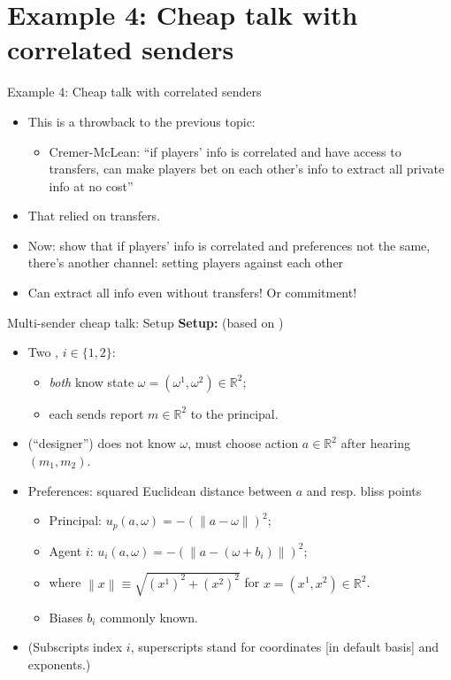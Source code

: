 \documentclass[english,10pt
,aspectratio=169
]{beamer}
\begin{document}
\section{Example 4: Cheap talk with correlated senders}

\begin{frame}{Example 4: Cheap talk with correlated senders}
	\begin{itemize}
		\item This is a throwback to the previous topic:
		\begin{itemize}
			\item Cremer-McLean: ``if players' info is correlated and have access to transfers, can make players bet on each other's info to extract all private info at no cost''
		\end{itemize}
		
		\item That relied on transfers. 
		\item Now: show that if players' info is correlated and preferences not the same, there's another channel: setting players against each other
		\item Can extract all info even without transfers! Or commitment!
	\end{itemize}
\end{frame}


\begin{frame}{Multi-sender cheap talk: Setup}
	\textbf{Setup:} (based on \cite{battaglini_multiple_2002})
	\begin{itemize}
		\item Two , $i \in \{1,2\}$:
		\begin{itemize}
			\item \emph{both} know \alert{state} $\omega = (\omega^1,\omega^2) \in \mathbb{R}^2$;
			\item each sends \alert{report} $m \in \mathbb{R}^2$ to the principal.
		\end{itemize}
		\item {} (``designer'') does not know $\omega$, must choose action $a \in \mathbb{R}^2$ \alert{after} hearing $(m_1,m_2)$.
		\item Preferences: squared Euclidean distance between $a$ and resp. \alert{bliss points}
		\begin{itemize}
			\item Principal: $u_p (a,\omega) = -\left(\left\|a-\omega\right\| \right)^2$;
			\item Agent $i$: $u_i (a,\omega) = -\left(\left\|a-(\omega+b_i)\right\| \right)^2$;
			\item where $\left\|x\right\| \equiv \sqrt{(x^1)^2 + (x^2)^2}$ for $x = (x^1,x^2) \in \mathbb{R}^2$.
			\item \alert{Biases} $b_i$ commonly known.
		\end{itemize}
		\item (Subscripts index $i$, superscripts stand for coordinates [in default basis] and exponents.)
	\end{itemize}
\end{frame}
\end{document}
